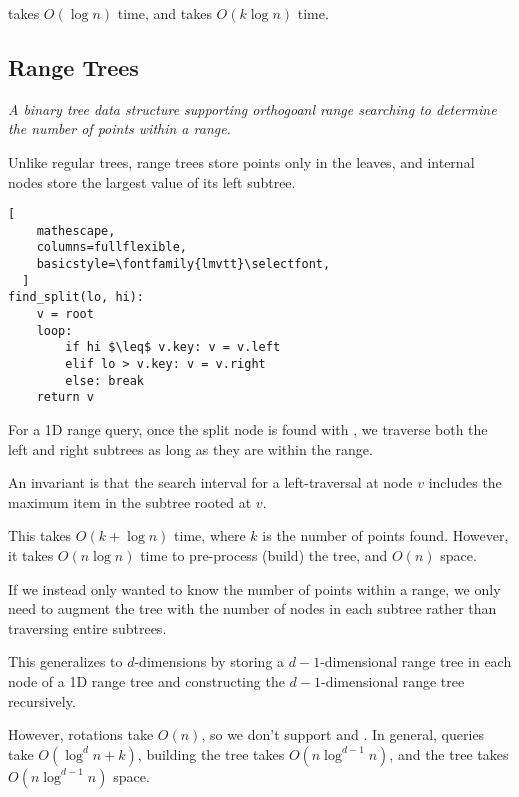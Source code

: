  takes $O(\log n)$ time, and  takes $O(k \log n)$ time.

\subsection{Range Trees}
\emph{A binary tree data structure supporting orthogoanl range searching to determine the number of points within a range.}

Unlike regular trees, range trees store points only in the leaves, and internal nodes store the largest value of its left subtree.

\begin{lstlisting}[
    mathescape,
    columns=fullflexible,
    basicstyle=\fontfamily{lmvtt}\selectfont,
  ]
find_split(lo, hi):
    v = root
    loop:
        if hi $\leq$ v.key: v = v.left
        elif lo > v.key: v = v.right
        else: break
    return v
\end{lstlisting}

For a 1D range query, once the split node is found with ,
we traverse both the left and right subtrees as long as they are within the  range.

An invariant is that the search interval for a left-traversal at node $v$ includes the maximum item in the subtree rooted at $v$.

This takes $O(k + \log n)$ time, where $k$ is the number of points found.
However, it takes $O(n \log n)$ time to pre-process (build) the tree, and $O(n)$ space.

If we instead only wanted to know the number of points within a range,
we only need to augment the tree with the number of nodes in each subtree rather
than traversing entire subtrees.

This generalizes to $d$-dimensions by storing a $d-1$-dimensional range tree in each node
of a 1D range tree and constructing the $d-1$-dimensional range tree recursively.

However, rotations take $O(n)$, so we don't support  and .
In general, queries take $O(\log^d n + k)$, building the tree takes $O(n \log^{d-1} n)$, and
the tree takes $O(n \log^{d-1} n)$ space.